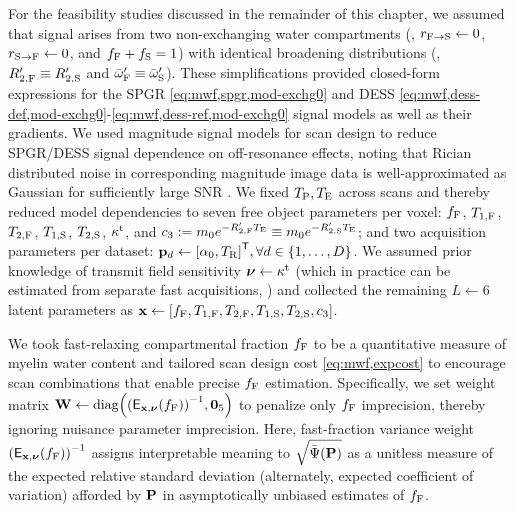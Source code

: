 For the feasibility studies
discussed in the remainder of this chapter,
we assumed that signal arises
from two non-exchanging water compartments
(\ie, $r_{\mathrm{F}\to\mathrm{S}} \gets 0$, $r_{\mathrm{S}\to\mathrm{F}} \gets 0$, and $f_{\mathrm{F}} + f_{\mathrm{S}} = 1$)
with identical broadening distributions
(\ie, $R_{2,\mathrm{F}}' \equiv R_{2,\mathrm{S}}'$ and $\bar{\omega}_{\mathrm{F}}' \equiv \bar{\omega}_{\mathrm{S}}'$).
These simplifications provided closed-form expressions
for the SPGR 
\eqref{eq:mwf,spgr,mod-exchg0}
and DESS 
\eqref{eq:mwf,dess-def,mod-exchg0}-\eqref{eq:mwf,dess-ref,mod-exchg0}
signal models 
as well as their gradients.
We used magnitude signal models
for scan design
to reduce SPGR/DESS signal dependence
on off-resonance effects,
noting that Rician distributed noise 
in corresponding magnitude image data
is well-approximated as Gaussian
for sufficiently large SNR \cite{gudbjartsson:95:trd}. 
We fixed $T_\mathrm{P},T_\mathrm{E}$ across scans
and thereby reduced model dependencies 
to seven free object parameters per voxel:
$f_{\mathrm{F}}$, $T_{1,\mathrm{F}}$, $T_{2,\mathrm{F}}$, $T_{1,\mathrm{S}}$, $T_{2,\mathrm{S}}$, $\kappa^{\mathrm{t}}$, and
$c_{3} := m_0 e^{-R_{2,\mathrm{F}}' T_\mathrm{E}} \equiv m_0 e^{-R_{2,\mathrm{S}}' T_\mathrm{E}}$;
and two acquisition parameters per dataset:
$\bmp_d \gets \brac{\flipnom, \TR}\tpose, \forall d \in \set{1,\dots,D}$.
We assumed prior knowledge 
of transmit field sensitivity $\boldsymbol{\nu} \gets \kappa^{\mathrm{t}}$ 
(which in practice can be estimated
from separate fast acquisitions, \eg \cite{sacolick:10:bmb})
and collected the remaining $L \gets 6$ latent parameters
as $\bmx \gets \brac{\ff, \tf{1}, \tf{2}, \ts{1}, \ts{2}, \const{3}}$.

We took fast-relaxing compartmental fraction $f_{\mathrm{F}}$ 
to be a quantitative measure 
of myelin water content 
and tailored scan design cost \eqref{eq:mwf,expcost}
to encourage scan combinations
that enable precise $f_{\mathrm{F}}$ estimation.
Specifically,
we set weight matrix 
$\bmW \gets \diag{\inv{\expect{\bmx,\bmnu}{\ff}}, \zeros{5}}$
to penalize only $f_{\mathrm{F}}$ imprecision,
thereby ignoring nuisance parameter imprecision.
Here, 
fast-fraction variance weight 
$\inv{\expect{\bmx,\bmnu}{\ff}}$ assigns interpretable meaning
to $\sqrt{\expcost\paren{\bmP}}$ 
as a unitless measure
of the expected relative standard deviation
(alternately, expected coefficient of variation)
afforded by $\mathbf{P}$ 
in asymptotically unbiased estimates of $f_{\mathrm{F}}$. 

